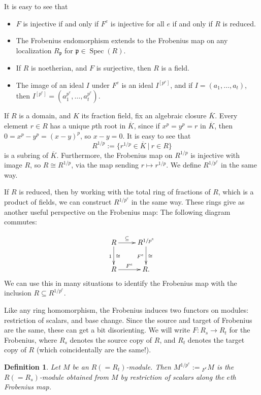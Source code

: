 \documentclass[11pt]{book}
\newtheorem{definition}[theorem]{Definition}
\numberwithin{equation}{section}
\numberwithin{theorem}{chapter}
\theoremstyle{definition}
\newtheorem*{basic properties}{Basic Properties}
\newtheorem*{Important Remark}{Important Remark}
\theoremstyle{remark}
\newcommand{\p}{\mathfrak{p}}
\newcommand{\Spec}{\operatorname{Spec}}
\begin{document}
It is easy to see that
\begin{itemize}
	\item $F$ is injective if and only if $F^e$ is injective for all $e$ if and only if $R$ is reduced.
	\item The Frobenius endomorphism extends to the Frobenius map on any localization $R_\p$ for $\p\in \Spec(R)$.
	\item If $R$ is noetherian, and $F$ is surjective, then $R$ is a field.
	\item The image of an ideal $I$ under $F^e$ is an ideal $I^{[p^e]}$, and if $I=(a_1,\dots,a_t)$, then $I^{[p^e]}=(a_1^{p^e},\dots,a_t^{p^e})$.
\end{itemize}

If $R$ is a domain, and $K$ its fraction field, fix an algebraic closure $\overline{K}$. Every element $r\in R$ has a unique $p$th root in $\overline{K}$, since if $x^p=y^p=r$ in $\overline{K}$, then $0=x^p-y^p=(x-y)^p$, so $x-y=0$. It is easy to see that 
\[ R^{1/p} := \{ r^{1/p}\in \overline{K} \ | \ r\in R\}\]  
is a subring of $\overline{K}$. Furthermore, the Frobenius map on $R^{1/p}$ is injective with image $R$, so $R\cong R^{1/p}$, via the map sending $r\mapsto r^{1/p}$. We define $R^{1/p^e}$ in the same way.

If $R$ is reduced, then by working with the total ring of fractions of $R$, which is a product of fields, we can construct $R^{1/p^e}$ in the same way. These rings give as another useful perspective on the Frobenius map: The following diagram commutes:

\[ \xymatrix{ R \ar[r]^-{\subseteq} \ar[d]_{1}^{\cong} & R^{1/p^e}  \ar[d]_{F^e}^{\cong} \\ R \ar[r]^-{F^e}  & R .}\]
We can use this in many situations to identify the Frobenius map with the inclusion $R\subseteq R^{1/p^e}$.

Like any ring homomorphism, the Frobenius induces two functors on modules: restriction of scalars, and base change. Since the source and target of Frobenius are the same, these can get a bit disorienting. We will write $F:R_s \to R_t$ for the Frobenius, where $R_s$ denotes the source copy of $R$, and $R_t$ denotes the target copy of $R$ (which coincidentally are the same!).

\begin{definition}
	Let $M$ be an $R (=R_t)$-module. Then $M^{1/p^e}:= {}_{F^e} M$ is the $R (=R_s)$-module  obtained from $M$ by restriction of scalars along the $e$th Frobenius map.
\end{definition}
\end{document}
